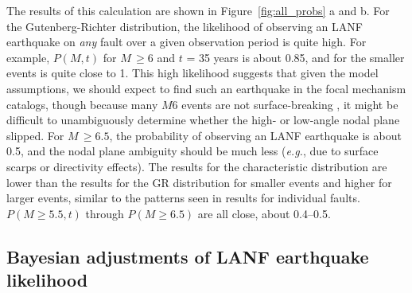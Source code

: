 \documentclass[draft,grl]{AGUTeX}
\begin{document}
\begin{article}
The results of this calculation are shown in Figure~\ref{fig:all_probs} a and b.
For the Gutenberg-Richter distribution, the likelihood of observing an LANF
earthquake on \emph{any} fault over a given observation period is quite high.
For example, $P(M,t)$ for $M \, \ge 6$ and $t$ = 35 years is about 0.85, and
for the smaller events is quite close to 1.  This high likelihood suggests that
given the model assumptions, we should expect to find such an earthquake in the
focal mechanism catalogs, though because many $M6$ events are not
surface-breaking \citep{hecker2013eqdist}, it might be difficult to
unambiguously determine whether the high- or low-angle nodal plane slipped.
For $M \, \ge 6.5$, the probability of observing an LANF earthquake is about
0.5, and the nodal plane ambiguity should be much less ({\it e.g.}, due to
surface scarps or directivity effects).  The results for the characteristic
distribution are lower than the results for the GR distribution for smaller
events and higher for larger events, similar to the patterns seen in results
for individual faults. $P(M\ge5.5,t)$ through $P(M\ge6.5)$ are all close, about
0.4--0.5.

\subsection{Bayesian adjustments of LANF earthquake likelihood}


\end{article}
\end{document}
